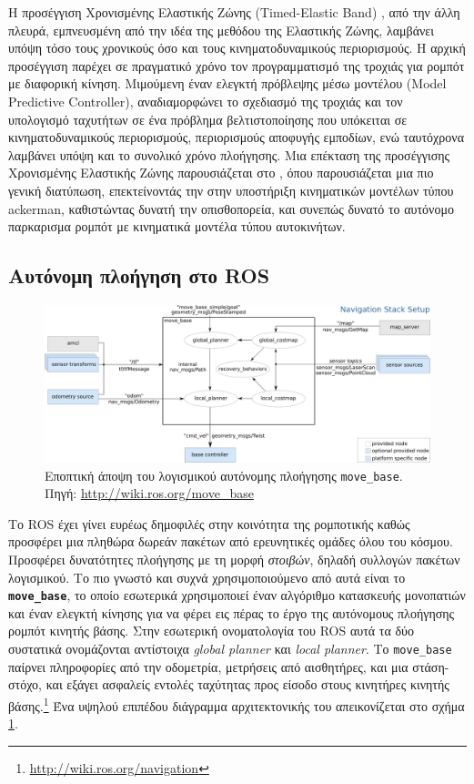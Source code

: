 Η προσέγγιση Χρονισμένης Ελαστικής Ζώνης (Timed-Elastic Band)
\cite{ChristophRoesmann}, από την άλλη πλευρά, εμπνευσμένη από την ιδέα της
μεθόδου της Ελαστικής Ζώνης, λαμβάνει υπόψη τόσο τους χρονικούς όσο και τους
κινηματοδυναμικούς περιορισμούς. Η αρχική προσέγγιση παρέχει σε πραγματικό
χρόνο τον προγραμματισμό της τροχιάς για ρομπότ με διαφορική κίνηση. Μιμούμενη
έναν ελεγκτή πρόβλεψης μέσω μοντέλου (Model Predictive Controller),
αναδιαμορφώνει το σχεδιασμό της τροχιάς και τον υπολογισμό ταχυτήτων σε ένα
πρόβλημα βελτιστοποίησης που υπόκειται σε κινηματοδυναμικούς περιορισμούς,
περιορισμούς αποφυγής εμποδίων, ενώ ταυτόχρονα λαμβάνει υπόψη και το συνολικό
χρόνο πλοήγησης. Μια επέκταση της προσέγγισης Χρονισμένης Ελαστικής Ζώνης
παρουσιάζεται στο \cite{Rosmann2017}, όπου παρουσιάζεται μια πιο γενική
διατύπωση, επεκτείνοντάς την στην υποστήριξη κινηματικών μοντέλων τύπου
ackerman, καθιστώντας δυνατή την οπισθοπορεία, και συνεπώς δυνατό το αυτόνομο
παρκαρισμα ρομπότ με κινηματικά μοντέλα τύπου αυτοκινήτων.



\subsection{Αυτόνομη πλοήγηση στο ROS}

\begin{figure}\centering
  \includegraphics[width=\textwidth]{./figures/parts/01/chapters/03/sections/01/move_base.png}
  \caption{\small Εποπτική άποψη του λογισμικού αυτόνομης πλοήγησης
           \texttt{move\_base}. Πηγή: \url{http://wiki.ros.org/move\_base}}
  \label{fig:movebase}
\end{figure}

Το ROS έχει γίνει ευρέως δημοφιλές στην κοινότητα της ρομποτικής καθώς
προσφέρει μια πληθώρα δωρεάν πακέτων από ερευνητικές ομάδες όλου του κόσμου.
Προσφέρει δυνατότητες πλοήγησης με τη μορφή \textit{στοιβών}, δηλαδή
συλλογών πακέτων λογισμικού. Το πιο γνωστό και συχνά χρησιμοποιούμενο από αυτά
είναι το \texttt{\textbf{move\_base}}, το οποίο εσωτερικά χρησιμοποιεί έναν
αλγόριθμο κατασκευής μονοπατιών και έναν ελεγκτή κίνησης για να φέρει εις πέρας
το έργο της αυτόνομους πλοήγησης ρομπότ κινητής βάσης. Στην εσωτερική
ονοματολογία του ROS αυτά τα δύο συστατικά ονομάζονται αντίστοιχα
\textit{global planner} και \textit{local planner}. Το \texttt{move\_base}
παίρνει πληροφορίες από την οδομετρία, μετρήσεις από αισθητήρες, και μια
στάση-στόχο, και εξάγει ασφαλείς εντολές ταχύτητας προς είσοδο στους κινητήρες
κινητής βάσης.\footnote{\url{http://wiki.ros.org/navigation}} Ένα υψηλού
επιπέδου διάγραμμα αρχιτεκτονικής του απεικονίζεται στο σχήμα
\ref{fig:movebase}.

